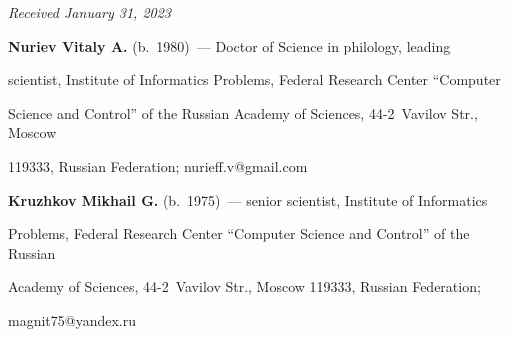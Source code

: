 




\vspace*{-6pt}





\hfill{\small\textit{Received January 31, 2023}} 





\vspace*{-10pt} 





\Contr





\vspace*{-4pt}





\noindent


\textbf{Nuriev Vitaly A.} (b.\ 1980)~--- Doctor of Science in philology, leading 


scientist, Institute of Informatics Problems, Federal Research Center ``Computer 


Science and Control'' of the Russian Academy of Sciences, 44-2~Vavilov Str., Moscow 


119333, Russian Federation; \mbox{nurieff.v@gmail.com}





\vspace*{3pt}





\noindent


\textbf{Kruzhkov Mikhail G.} (b.\ 1975)~--- senior scientist, Institute of Informatics 


Problems, Federal Research Center ``Computer Science and Control'' of the Russian 


Academy of Sciences, 44-2~Vavilov Str., Moscow 119333, Russian Federation; 


\mbox{magnit75@yandex.ru}


 





\label{end\stat}





\renewcommand{\bibname}{\protect\rm Литература} 


